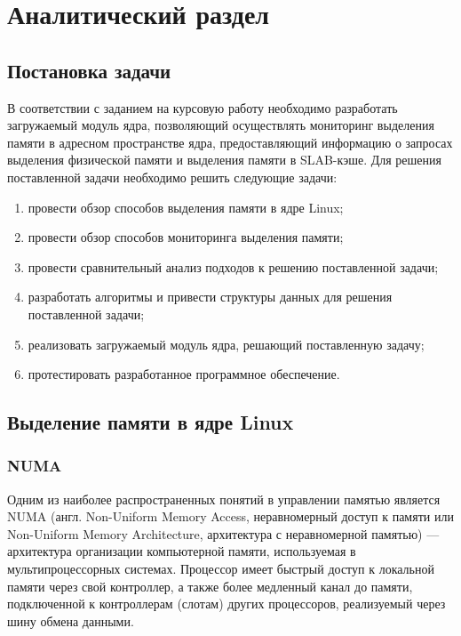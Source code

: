 \section{Аналитический раздел}

\subsection{Постановка задачи}

В соответствии с заданием на курсовую работу необходимо разработать загружаемый модуль ядра, позволяющий осуществлять мониторинг выделения памяти в адресном пространстве ядра, предоставляющий информацию о запросах выделения физической памяти и выделения памяти в SLAB-кэше.
Для решения поставленной задачи необходимо решить следующие задачи:
\begin{enumerate}
    \item провести обзор способов выделения памяти в ядре Linux;
    \item провести обзор способов мониторинга выделения памяти;
    \item провести сравнительный анализ подходов к решению поставленной задачи;
    \item разработать алгоритмы и привести структуры данных для решения поставленной задачи;
    \item реализовать загружаемый модуль ядра, решающий поставленную задачу;
    \item протестировать разработанное программное обеспечение.
\end{enumerate}

\subsection{Выделение памяти в ядре Linux}


\subsubsection{NUMA}

Одним из наиболее распространенных понятий в управлении памятью является NUMA (англ. Non-Uniform Memory Access, неравномерный доступ к памяти или Non-Uniform Memory Architecture, архитектура с неравномерной памятью) --- архитектура организации компьютерной памяти, используемая в мультипроцессорных системах.
Процессор имеет быстрый доступ к локальной памяти через свой контроллер, а также более медленный канал до памяти, подключенной к контроллерам (слотам) других процессоров, реализуемый через шину обмена данными.~\cite{mem}

